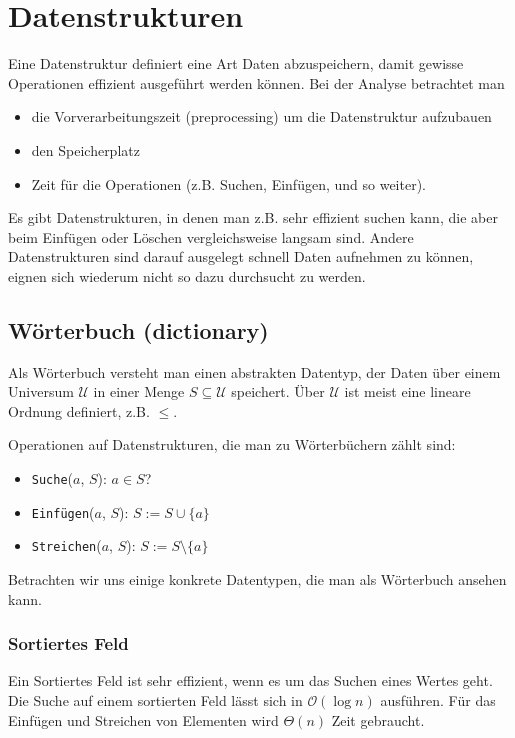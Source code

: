 \chapter{Datenstrukturen}
\begin{Def}[Datenstruktur]
\hspace{\parindent}Eine Datenstruktur definiert eine Art Daten abzuspeichern, damit gewisse Operationen effizient ausgeführt werden können. Bei der Analyse betrachtet man
  \begin{itemize}
    \item die Vorverarbeitungszeit (preprocessing) um die Datenstruktur aufzubauen
    \item den Speicherplatz
    \item Zeit für die Operationen (z.B. Suchen, Einfügen, und so weiter).
  \end{itemize}
\end{Def}

Es gibt Datenstrukturen, in denen man z.B. sehr effizient suchen kann, die aber beim Einfügen oder Löschen vergleichsweise langsam sind. Andere Datenstrukturen sind darauf ausgelegt schnell Daten aufnehmen zu können, eignen sich wiederum nicht so dazu durchsucht zu werden.	

\section{Wörterbuch (dictionary)}
Als Wörterbuch versteht man einen abstrakten Datentyp, der Daten über einem Universum $\mathcal{U}$ in einer Menge $S \subseteq \mathcal{U}$  speichert. Über $\mathcal{U}$ ist meist eine lineare Ordnung definiert, z.B. $\le$.

Operationen auf Datenstrukturen, die man zu Wörterbüchern zählt sind:
\begin{itemize}
  \item \texttt{Suche}($a$, $S$): $a \in S$?
  \item \texttt{Einfügen}($a$, $S$): $S := S \cup \{a\}$
  \item \texttt{Streichen}($a$, $S$): $S := S \setminus \{a\}$
\end{itemize}

Betrachten wir uns einige konkrete Datentypen, die man als Wörterbuch ansehen kann.

\subsection{Sortiertes Feld}
Ein Sortiertes Feld ist sehr effizient, wenn es um das Suchen eines Wertes geht. Die Suche auf einem sortierten Feld lässt sich in $\mathcal{O}(\log n)$ ausführen. Für das Einfügen und Streichen von Elementen wird $\Theta(n)$ Zeit gebraucht.


